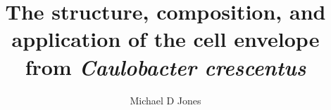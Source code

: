 \documentclass[gpscopy,onehalfspacing,11pt]{ubcdiss}
\title{The structure, composition, and application of the cell envelope from \textit{Caulobacter crescentus}}
\author{Michael D Jones}
\begin{document}

\maketitle


	\cleardoublepage


	\cleardoublepage

\tableofcontents
	\cleardoublepage	%

\listoftables
	\cleardoublepage	%

\listoffigures
	\cleardoublepage	%


	\textspacing		%




\mainmatter

	\acresetall	%



%
%
%
%
%
\renewcommand{\mkbibnamefirst}[1]{\textsc{#1}}
\renewcommand{\mkbibnamelast}[1]{\textsc{#1}}
\renewcommand{\mkbibnameprefix}[1]{\textsc{#1}}
\renewcommand{\mkbibnameaffix}[1]{\textsc{#1}} 
\printbibliography[heading=bibintoc]

\appendix


\backmatter
\end{document}
